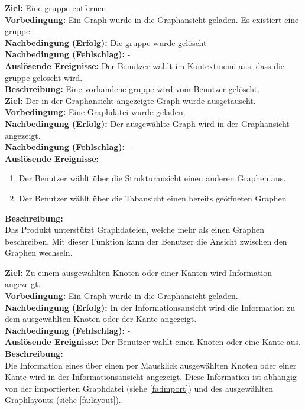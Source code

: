 \label{fa:deletegruppe}
\textbf{Ziel:} Eine \gls{gruppe} entfernen \\
\textbf{Vorbedingung:} Ein Graph wurde in die Graphansicht geladen. Es existiert eine \gls{gruppe}.\\
\textbf{Nachbedingung (Erfolg):} Die \gls{gruppe} wurde gelöscht\\
\textbf{Nachbedingung (Fehlschlag):} - \\
\textbf{Auslösende Ereignisse:} Der Benutzer wählt im Kontextmenü aus, dass die \gls{gruppe} gelöscht wird. \\
\textbf{Beschreibung:} Eine vorhandene \gls{gruppe} wird vom Benutzer gelöscht.\\

\label{fa:graphwechsel}
\textbf{Ziel:} Der in der Graphansicht angezeigte Graph wurde ausgetauscht. \\
\textbf{Vorbedingung:} Eine Graphdatei wurde geladen.\\
\textbf{Nachbedingung (Erfolg):} Der ausgewählte Graph wird in der Graphansicht angezeigt.\\
\textbf{Nachbedingung (Fehlschlag):} -\\
\textbf{Auslösende Ereignisse:}
\begin{enumerate}[nolistsep, label=(\alph*)]
  \item Der Benutzer wählt über die Strukturansicht einen anderen Graphen aus.
  \item Der Benutzer wählt über die Tabansicht einen bereits geöffneten Graphen %
\end{enumerate}
\textbf{Beschreibung:}\\
Das Produkt unterstützt Graphdateien, welche mehr als einen Graphen beschreiben.
Mit dieser Funktion kann der Benutzer die Ansicht zwischen den Graphen wechseln.

\label{fa:infoanzeige}
\textbf{Ziel:} Zu einem ausgewählten Knoten oder einer Kanten wird Information angezeigt.\\
\textbf{Vorbedingung:} Ein Graph wurde in die Graphansicht geladen.\\
\textbf{Nachbedingung (Erfolg):} In der Informationsansicht wird die Information zu dem ausgewählten Knoten oder der Kante angezeigt.\\
\textbf{Nachbedingung (Fehlschlag):} -\\
\textbf{Auslösende Ereignisse:} Der Benutzer wählt einen Knoten oder eine Kante aus.\\
\textbf{Beschreibung:}\\
Die Information eines über einen per Mausklick ausgewählten Knoten oder einer Kante wird in der Informationsansicht angezeigt. Diese Information ist abhängig von der importierten Graphdatei (siehe \ref{fa:import}) und des ausgewählten Graphlayouts (siehe \ref{fa:layout}).

